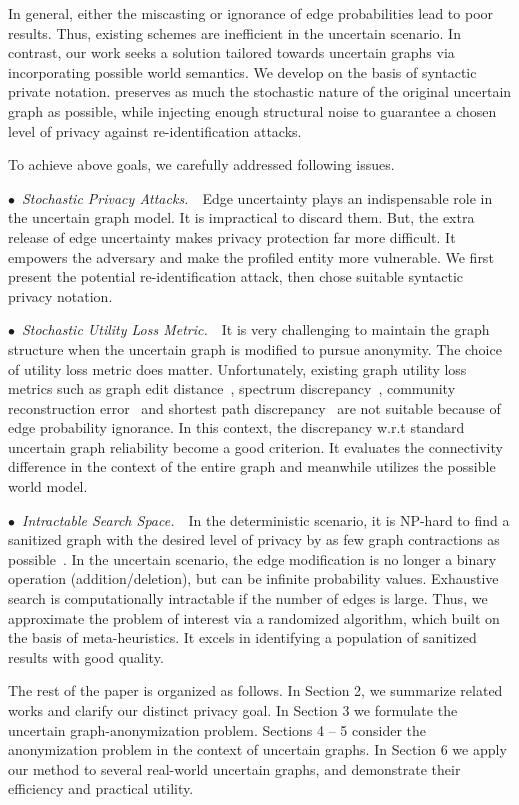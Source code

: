 In general, either the miscasting or ignorance of edge probabilities lead to poor results. 
Thus, existing schemes are inefficient in the uncertain scenario. In contrast, our work seeks a solution tailored towards uncertain graphs via incorporating possible world semantics. We develop {\methodName} on the basis of syntactic private notation. {\methodName} preserves as much the stochastic nature of the original uncertain graph as possible, while injecting enough structural noise to guarantee a chosen level of privacy against re-identification attacks. 

To achieve above goals, we carefully addressed following issues. 

$\bullet$~\textup{\emph{Stochastic Privacy Attacks.}}~~Edge uncertainty plays an indispensable role in the uncertain graph model. It is impractical to discard them. But, the extra release of edge uncertainty makes privacy protection far more difficult.  It  empowers the adversary and make the profiled entity more vulnerable. We first present the potential re-identification attack, then chose suitable syntactic privacy notation. 

$\bullet$~\textup{\emph{Stochastic Utility Loss Metric.}}~~It is very challenging to maintain the graph structure when the uncertain graph is modified to pursue anonymity. The choice of utility loss metric does matter. Unfortunately, existing graph utility loss metrics such as graph edit distance~\cite{Liu_Towards_2008}, spectrum discrepancy~\cite{Ying_Randomizing_2008}, community reconstruction error~\cite{Wang2011} and shortest path discrepancy~\cite{Liu_Privacy_2009} are not suitable because of edge probability ignorance. In this context, the discrepancy w.r.t standard uncertain graph reliability become a good criterion. It evaluates the connectivity difference in the context of the entire graph and meanwhile utilizes the possible world model. 

$\bullet$~\textup{\emph{Intractable Search Space.}}~~In the deterministic scenario, it is NP-hard to find a sanitized graph with the desired level of privacy by as few graph contractions as possible~\cite{Hartung_Theory_2015}. In the uncertain scenario, the edge modification is no longer a binary operation (addition/deletion), but can be infinite probability values. Exhaustive search is computationally intractable if the number of edges is large. Thus, we approximate the problem of interest via a randomized algorithm, which built on the basis of meta-heuristics. It excels in identifying a population of sanitized results with good quality.

The rest of the paper is organized as follows. In Section 2, we summarize related works and clarify our distinct  privacy  goal. In Section 3 we formulate the uncertain graph-anonymization problem.  
Sections 4 – 5 consider the anonymization problem in the context of uncertain graphs.  In Section 6 we apply our method to several real-world uncertain graphs, and demonstrate their efficiency and practical utility. 
